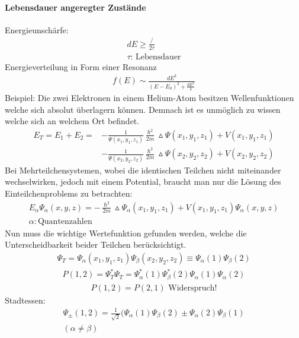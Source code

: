 \documentclass[10pt,a4paper]{article}
\begin{document}
\paragraph{Lebensdauer angeregter Zustände} $\,$ \\
Energieunschärfe:
\begin{align}
dE\geq \frac{\slash}{2 \tau} \\
 \tau \text{: Lebensdauer}
\end{align}
Energieverteilung in Form einer Resonanz
\begin{align}
f(E)\sim \frac{dE^2}{(E-E_0)^2+\frac{dE^2}{4}}
\end{align}
Beispiel: Die zwei Elektronen in einem Helium-Atom besitzen Wellenfunktionen welche sich absolut überlagern können. Demnach ist es unmöglich zu wissen welche sich an welchem Ort befindet.
\begin{align}
E_T=E_1+E_2 = &-\frac{1}{\Psi(x_1, y_1, z_1)} \frac{\hslash^2}{2m} \vartriangle \Psi (x_1, y_1, z_1) +V(x_1, y_1, z_1)\\ &- \frac{1}{\Psi(x_2, y_2, z_2)} \frac{\hslash^2}{2m} \vartriangle \Psi (x_2, y_2, z_2) +V(x_2, y_2, z_2)
\end{align}
Bei Mehrteilchensystemen, wobei die identischen Teilchen nicht miteinander wechselwirken, jedoch mit einem Potential, braucht man nur die Lösung des Einteilchenproblems zu betrachten:
\begin{align}
E_{\alpha} \Psi_{\alpha} (x, y, z) = -\frac{\hslash^2}{2m} \vartriangle \Psi_{\alpha} (x_1, y_1, z_1) +V(x_1, y_1, z_1) \Psi_{\alpha} (x, y, z) \\
\alpha: \text{Quantenzahlen}
\end{align}
Nun muss die wichtige Wertefunktion gefunden werden, welche die Unterscheidbarkeit beider Teilchen berücksichtigt.
\begin{align}
\Psi_T=\Psi_{\alpha} (x_1, y_1, z_1) \Psi_{\beta} (x_2, y_2, z_2) \equiv \Psi_{\alpha} (1) \Psi_{\beta} (2)
\end{align}
\begin{align}
P(1,2)=\Psi_T^* \Psi_T =\Psi_{\alpha} ^* (1) \Psi_{\beta} ^* (2) \Psi_{\alpha} (1) \Psi_{\alpha} (2)
\end{align}
\begin{align}
P(1,2) = P(2,1) \text{ Widerspruch!}
\end{align}
Stadtessen:
\begin{align}
\Psi_{\pm} (1,2)= \frac{1}{\sqrt{2}} (\Psi_{\alpha}(1) \Psi_{\beta}(2) \pm \Psi_{\alpha}(2) \Psi_{\beta}(1) \\
(\alpha \neq \beta)
\end{align}
\end{document}
